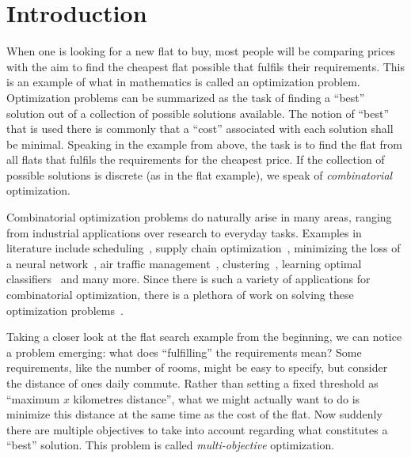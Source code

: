 \chapter{Introduction\label{chap:intro}}

When one is looking for a new flat to buy, most people will be comparing prices with the aim to find the cheapest flat possible that fulfils their requirements.
This is an example of what in mathematics is called an optimization problem.
Optimization problems can be summarized as the task of finding a ``best'' solution out of a collection of possible solutions available.
The notion of ``best'' that is used there is commonly that a ``cost'' associated with each solution shall be minimal.
Speaking in the example from above, the task is to find the flat from all flats that fulfils the requirements for the cheapest price.
If the collection of possible solutions is discrete (as in the flat example), we speak of \emph{combinatorial} optimization.

Combinatorial optimization problems do naturally arise in many areas, ranging from industrial applications over research to everyday tasks.
Examples in literature include scheduling~\autocite{DBLP:conf/cp/Stojadinovic14,DBLP:conf/cpaior/BofillGSV15,DBLP:journals/ior/Solomon87,DBLP:journals/candie/AkyolB07}, supply chain optimization~\autocite{}, minimizing the loss of a neural network~\autocite{}, air traffic management~\autocite{DBLP:journals/ior/BertsimasLO11,RichardsHow2002Aircrafttrajectoryplanning}, clustering~\autocite{DBLP:journals/ai/DaoDV17,DBLP:conf/sdm/DavidsonRS10}, learning optimal classifiers~\autocite{DBLP:conf/cp/MaliotovM18,DBLP:conf/ijcai/NarodytskaIPM18,DBLP:conf/ijcai/Hu0HH20,DBLP:conf/cp/YuISB20,DBLP:conf/aaai/DemirovicS21,DBLP:conf/cp/ShatiCM21} and many more.
Since there is such a variety of applications for combinatorial optimization, there is a plethora of work on solving these optimization problems~\autocite{}.

Taking a closer look at the flat search example from the beginning, we can notice a problem emerging:
what does ``fulfilling'' the requirements mean?
Some requirements, like the number of rooms, might be easy to specify, but consider the distance of ones daily commute.
Rather than setting a fixed threshold as ``maximum $x$ kilometres distance'', what we might actually want to do is minimize this distance at the same time as the cost of the flat.
Now suddenly there are multiple objectives to take into account regarding what constitutes a ``best'' solution.
This problem is called \emph{multi-objective} optimization.

